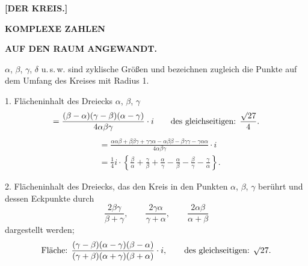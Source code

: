 \clearpage{}
\begin{center}
\textbf{[DER KREIS.]}\par\medskip
[I.]\par\medskip
\textbf{KOMPLEXE ZAHLEN}\par
\textbf{AUF DEN RAUM ANGEWANDT.}
\end{center}

$\alpha$, $\beta$, $\gamma$, $\delta$ u.\,s.\,w. sind zyklische Größen und bezeichnen zugleich die Punkte auf dem Umfang des Kreises mit Radius 1.

1. Flächeninhalt des Dreiecks $\alpha$, $\beta$, $\gamma$
\[
=\frac{(\beta-\alpha)(\gamma-\beta)(\alpha-\gamma)}{4\alpha\beta\gamma}\cdot i
\qquad \text{des gleichseitigen: }\frac{\mathord{\surd}27}{4}.
\]
\[
\begin{aligned}
&=\frac{\alpha\alpha\beta+\beta\beta\gamma+\gamma\gamma\alpha-\alpha\beta\beta-\beta\gamma\gamma-\gamma\alpha\alpha}{4\alpha\beta\gamma}\cdot i\\
&=\tfrac{1}{4}i\cdot\left\{\frac{\beta}{\alpha}+\frac{\gamma}{\beta}+\frac{\alpha}{\gamma}-\frac{\alpha}{\beta}-\frac{\beta}{\gamma}-\frac{\gamma}{\alpha}\right\}.
\end{aligned}
\]

2. Flächeninhalt des Dreiecks, das den Kreis in den Punkten $\alpha$, $\beta$, $\gamma$ berührt und dessen Eckpunkte durch
\[
\frac{2\beta\gamma}{\beta+\gamma},\qquad \frac{2\gamma\alpha}{\gamma+\alpha},\qquad \frac{2\alpha\beta}{\alpha+\beta}
\]
dargestellt werden;
\[
\text{Fläche: }\frac{(\gamma-\beta)(\alpha-\gamma)(\beta-\alpha)}{(\gamma+\beta)(\alpha+\gamma)(\beta+\alpha)}\cdot i,
\qquad\text{des gleichseitigen: }\mathord{\surd}27.
\]
